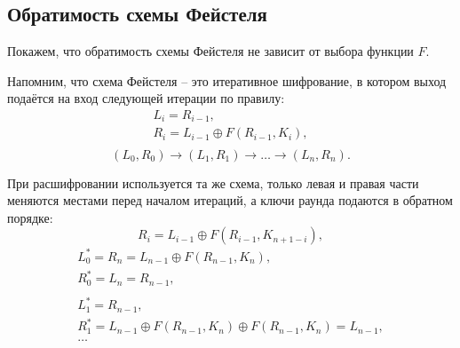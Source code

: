 \subsection{Обратимость схемы Фейстеля}

Покажем, что обратимость схемы Фейстеля не зависит от выбора функции $F$.

Напомним, что схема Фейстеля -- это итеративное шифрование, в котором выход подаётся на вход следующей итерации по правилу:
\[ \begin{array}{l}
    L_i = R_{i-1}, \\
    R_i = L_{i-1} \oplus F(R_{i-1}, K_i), \\
\end{array} \]
\[
    (L_0,R_0) \rightarrow (L_1,R_1) \rightarrow \ldots \rightarrow (L_n,R_n).
\]

При расшифровании используется та же схема, только левая и правая части меняются местами перед началом итераций, а ключи раунда подаются в обратном порядке:
    \[ R_i = L_{i-1} \oplus F(R_{i-1}, K_{n+1-i}), \]
\[ \begin{array}{l}
    L_0^* = R_n = L_{n-1} \oplus F(R_{n-1}, K_n), \\
    R_0^* = L_n = R_{n-1}, \\
    \\
    L_1^* = R_{n-1}, \\
    R_1^* = L_{n-1} \oplus F(R_{n-1}, K_n) \oplus F(R_{n-1}, K_n) = L_{n-1}, \\
    \dots
\end{array} \]
